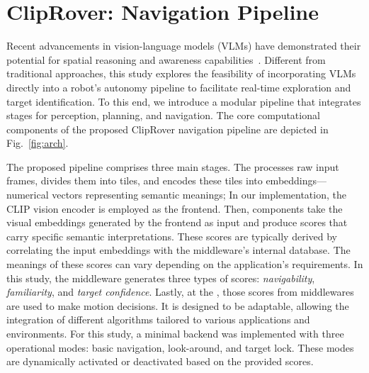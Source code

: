 \section{ClipRover: Navigation Pipeline}\label{sec:arch}

Recent advancements in vision-language models (VLMs) have demonstrated their potential for spatial reasoning and awareness capabilities~\cite{chen2024spatialvlm,dorbala2022clipnav}. Different from traditional approaches,  this study explores the feasibility of incorporating VLMs directly into a robot's autonomy pipeline to facilitate real-time exploration and target identification. To this end, we introduce a modular pipeline that integrates stages for perception, planning, and navigation. The core computational components of the proposed ClipRover navigation pipeline are depicted in Fig.~\ref{fig:arch}.

The proposed pipeline comprises three main stages.
The  
    processes raw input frames, divides them into tiles, and encodes these tiles into embeddings—numerical vectors representing semantic meanings; In our implementation, the CLIP vision encoder is employed as the frontend.
Then, 
    components take the visual embeddings generated by the frontend as input and produce scores that carry specific semantic interpretations. These scores are typically derived by correlating the input embeddings with the middleware's internal database. The meanings of these scores can vary depending on the application's requirements. In this study, the middleware generates three types of scores: \textit{navigability}, \textit{familiarity}, and \textit{target confidence}.
Lastly, at the ,
    those scores from middlewares are used to make motion decisions. It is designed to be adaptable, allowing the integration of different algorithms tailored to various applications and environments. For this study, a minimal backend was implemented with three operational modes: basic navigation, look-around, and target lock. These modes are dynamically activated or deactivated based on the provided scores.


